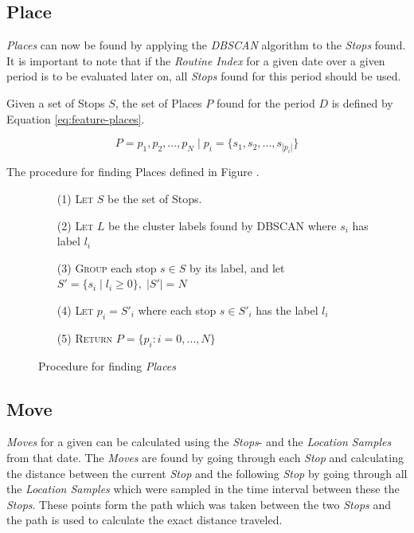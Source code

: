 \subsection{Place}
\textit{Places} can now be found by applying the \textit{DBSCAN} algorithm to the \textit{Stops} found. It is important to note that if the \textit{Routine Index} for a given date over a given period is to be evaluated later on, all \textit{Stops} found for this period should be used. 

Given a set of Stops $S$, the set of Places $P$ found for the period $D$ is defined by Equation \eqref{eq:feature-places}.

\begin{equation}
\label{eq:feature-places}
P = {p_1, p_2, ..., p_N} \;|\; p_i = \{s_1, s_2, ..., s_{|p_i|}\}
\end{equation}

The procedure for finding Places defined in Figure .

\begin{figure}[h]
    \centering
    \begin{center}
    \begin{itemize}
    \item[(1)] \textsc{Let} $S$ be the set of Stops.
    \item[(2)] \textsc{Let} $L$ be the cluster labels found by  DBSCAN where $s_i$ has label $l_i$ 
    \item[(3)] \textsc{Group} each stop $s \in S$ by its label, and let $S' = \{s_i \;|\; l_i \geq 0\}, \;|S'| = N$
    \item[(4)] \textsc{Let} $p_i = S'_i$ where each stop $s \in S'_i$ has the label $l_i$
    \item[(5)] \textsc{Return} $P = \{p_i : i = 0, ..., N\}$
\end{itemize} 
\end{center}
    \caption{Procedure for finding \textit{Places}}
    \label{fig:find_places}
\end{figure}

\subsection{Move}
\textit{Moves} for a given can be calculated using the \textit{Stops}- and the \textit{Location Samples} from that date. The \textit{Moves} are found by going through each \textit{Stop} and calculating the distance between the current \textit{Stop} and the following \textit{Stop} by going through all the \textit{Location Samples} which were sampled in the time interval between these the \textit{Stops}. These points form the path which was taken between the two \textit{Stops} and the path is used to calculate the exact distance traveled.

